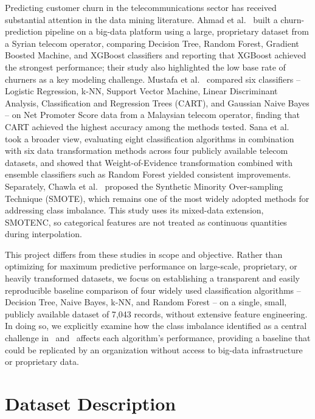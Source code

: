 \documentclass[conference]{IEEEtran}
\begin{document}
	Predicting customer churn in the telecommunications sector has received substantial attention in the data mining literature. Ahmad et al.~\cite{b1} built a churn-prediction pipeline on a big-data platform using a large, proprietary dataset from a Syrian telecom operator, comparing Decision Tree, Random Forest, Gradient Boosted Machine, and XGBoost classifiers and reporting that XGBoost achieved the strongest performance; their study also highlighted the low base rate of churners as a key modeling challenge. Mustafa et al.~\cite{b2} compared six classifiers -- Logistic Regression, k-NN, Support Vector Machine, Linear Discriminant Analysis, Classification and Regression Trees (CART), and Gaussian Naive Bayes -- on Net Promoter Score data from a Malaysian telecom operator, finding that CART achieved the highest accuracy among the methods tested. Sana et al.~\cite{b3} took a broader view, evaluating eight classification algorithms in combination with six data transformation methods across four publicly available telecom datasets, and showed that Weight-of-Evidence transformation combined with ensemble classifiers such as Random Forest yielded consistent improvements. Separately, Chawla et al.~\cite{b4} proposed the Synthetic Minority Over-sampling Technique (SMOTE), which remains one of the most widely adopted methods for addressing class imbalance. This study uses its mixed-data extension, SMOTENC, so categorical features are not treated as continuous quantities during interpolation.
	
	This project differs from these studies in scope and objective. Rather than optimizing for maximum predictive performance on large-scale, proprietary, or heavily transformed datasets, we focus on establishing a transparent and easily reproducible baseline comparison of four widely used classification algorithms -- Decision Tree, Naive Bayes, k-NN, and Random Forest -- on a single, small, publicly available dataset of 7{,}043 records, without extensive feature engineering. In doing so, we explicitly examine how the class imbalance identified as a central challenge in~\cite{b1} and~\cite{b4} affects each algorithm's performance, providing a baseline that could be replicated by an organization without access to big-data infrastructure or proprietary data.
	
	\section{Dataset Description}
	\label{sec:dataset}
	
\end{document}
